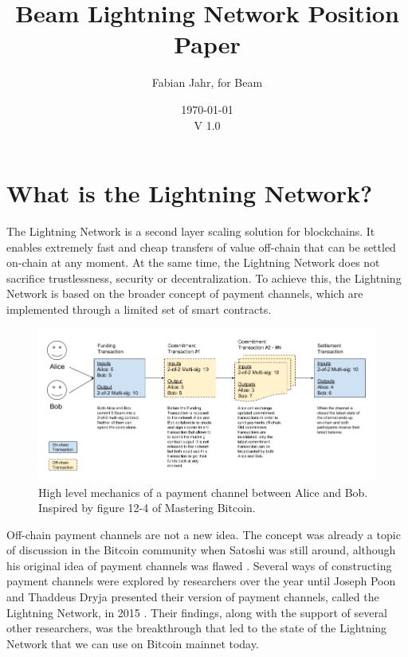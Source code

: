 \documentclass[letterpaper]{article}
\begin{document}
 
\title{Beam Lightning Network Position Paper}
\date{\today\\V 1.0}
\author{Fabian Jahr, for Beam}
 
\maketitle

\section{What is the Lightning Network?}
 The Lightning Network is a second layer scaling solution for blockchains. It enables extremely fast and cheap transfers of value off-chain that can be settled on-chain at any moment. At the same time, the Lightning Network does not sacrifice trustlessness, security or decentralization. To achieve this, the Lightning Network is based on the broader concept of payment channels, which are implemented through a limited set of smart contracts.

\begin{figure}[h]
	\centering
	\includegraphics[width=\textwidth]{payment_channel_high_level}
	\caption{High level mechanics of a payment channel between Alice and Bob. Inspired by figure 12-4 of Mastering Bitcoin.}
\end{figure}

Off-chain payment channels are not a new idea. The concept was already a topic of discussion in the Bitcoin community when Satoshi was still around, although his original idea of payment channels was flawed \cite{satoshi}. Several ways of constructing payment channels were explored by researchers over the year until Joseph Poon and Thaddeus Dryja presented their version of payment channels, called the Lightning Network, in 2015 \cite{lightning}. Their findings, along with the support of several other researchers, was the breakthrough that led to the state of the Lightning Network that we can use on Bitcoin mainnet today. 
\end{document}

